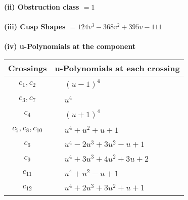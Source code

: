 \documentclass[1p]{elsarticle_modified}
\theoremstyle{definition}
\begin{document}
\flushleft \textbf{(ii) Obstruction class $= 1$}\\~\\
\flushleft \textbf{(iii) Cusp Shapes $= 124 v^3-368 v^2+395 v-111$}\\~\\
\newpage\renewcommand{\arraystretch}{1}
\flushleft \textbf{(iv) u-Polynomials at the component}\newline \\
\begin{tabular}{m{50pt}|m{274pt}}
Crossings & \hspace{64pt}u-Polynomials at each crossing \\
\hline $$\begin{aligned}c_{1},c_{2}\end{aligned}$$&$\begin{aligned}
&(u-1)^4
\end{aligned}$\\
\hline $$\begin{aligned}c_{3},c_{7}\end{aligned}$$&$\begin{aligned}
&u^4
\end{aligned}$\\
\hline $$\begin{aligned}c_{4}\end{aligned}$$&$\begin{aligned}
&(u+1)^4
\end{aligned}$\\
\hline $$\begin{aligned}c_{5},c_{8},c_{10}\end{aligned}$$&$\begin{aligned}
&u^4+u^2+u+1
\end{aligned}$\\
\hline $$\begin{aligned}c_{6}\end{aligned}$$&$\begin{aligned}
&u^4-2 u^3+3 u^2- u+1
\end{aligned}$\\
\hline $$\begin{aligned}c_{9}\end{aligned}$$&$\begin{aligned}
&u^4+3 u^3+4 u^2+3 u+2
\end{aligned}$\\
\hline $$\begin{aligned}c_{11}\end{aligned}$$&$\begin{aligned}
&u^4+u^2- u+1
\end{aligned}$\\
\hline $$\begin{aligned}c_{12}\end{aligned}$$&$\begin{aligned}
&u^4+2 u^3+3 u^2+u+1
\end{aligned}$\\
\hline
\end{tabular}\\~\\
\end{document}
